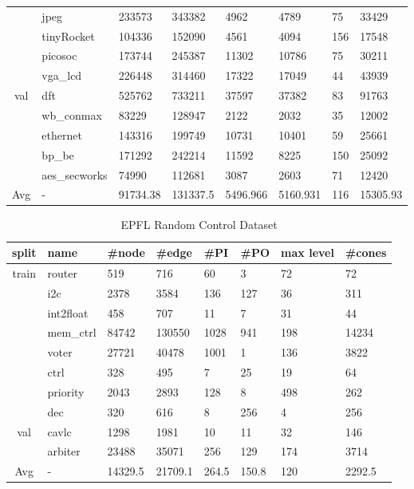 \begin{table}[H]
\begin{tabular}{@{}c|l|llllll@{}}
 & jpeg & 233573 & 343382 & 4962 & 4789 & 75 & 33429 \\
 & tinyRocket & 104336 & 152090 & 4561 & 4094 & 156 & 17548 \\
 & picosoc & 173744 & 245387 & 11302 & 10786 & 75 & 30211 \\
 & vga\_lcd & 226448 & 314460 & 17322 & 17049 & 44 & 43939 \\ \midrule
\multirow{5}{*}{val} & dft & 525762 & 733211 & 37597 & 37382 & 83 & 91763 \\
 & wb\_conmax & 83229 & 128947 & 2122 & 2032 & 35 & 12002 \\
 & ethernet & 143316 & 199749 & 10731 & 10401 & 59 & 25661 \\
 & bp\_be & 171292 & 242214 & 11592 & 8225 & 150 & 25092 \\
 & aes\_secworks & 74990 & 112681 & 3087 & 2603 & 71 & 12420 \\ \midrule
Avg & - & 91734.38 & 131337.5 & 5496.966 & 5160.931 & 116 & 15305.93 \\ \bottomrule
\end{tabular}
\end{table}

\begin{table}[H]
\caption{EPFL Random Control Dataset}
\centering
\begin{tabular}{@{}c|lllllll@{}}
\toprule
split & name & \#node & \#edge & \#PI & \#PO & max level & \#cones \\ \midrule
\multirow{8}{*}{train} & router & 519 & 716 & 60 & 3 & 72 & 72 \\
 & i2c & 2378 & 3584 & 136 & 127 & 36 & 311 \\
 & int2float & 458 & 707 & 11 & 7 & 31 & 44 \\
 & mem\_ctrl & 84742 & 130550 & 1028 & 941 & 198 & 14234 \\
 & voter & 27721 & 40478 & 1001 & 1 & 136 & 3822 \\
 & ctrl & 328 & 495 & 7 & 25 & 19 & 64 \\
 & priority & 2043 & 2893 & 128 & 8 & 498 & 262 \\
 & dec & 320 & 616 & 8 & 256 & 4 & 256 \\ \midrule
\multirow{2}{*}{val} & cavlc & 1298 & 1981 & 10 & 11 & 32 & 146 \\
 & arbiter & 23488 & 35071 & 256 & 129 & 174 & 3714 \\ \midrule
Avg & - & 14329.5 & 21709.1 & 264.5 & 150.8 & 120 & 2292.5 \\ \bottomrule
\end{tabular}
\label{epfl_data}
\end{table}


